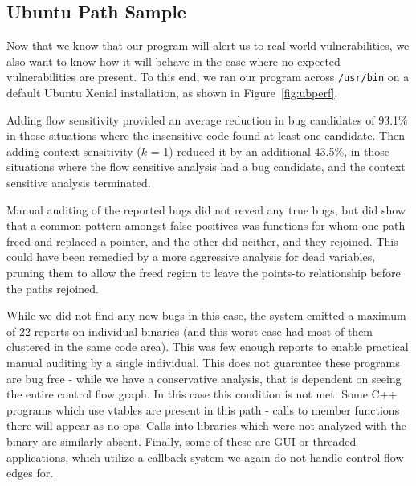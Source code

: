 \subsection{Ubuntu Path Sample}
Now that we know that our program will alert us to real world vulnerabilities, we also want to know how it will behave in the case where no expected vulnerabilities are present.
To this end, we ran our program across \texttt{/usr/bin} on a default Ubuntu Xenial installation, as shown in Figure~\ref{fig:ubperf}.

Adding flow sensitivity provided an average reduction in bug candidates of 93.1\% in those situations where the insensitive code found at least one candidate.
Then adding context sensitivity ($k$ = 1) reduced it by an additional 43.5\%, in those situations where the flow sensitive analysis had a bug candidate, and the context sensitive analysis terminated.

Manual auditing of the reported bugs did not reveal any true bugs, but did show that a common pattern amongst false positives was functions for whom one path freed and replaced a pointer, and the other did neither, and they rejoined.
This could have been remedied by a more aggressive analysis for dead variables, pruning them to allow the freed region to leave the points-to relationship before the paths rejoined.

While we did not find any new bugs in this case, the system emitted a maximum of 22 reports on individual binaries (and this worst case had most of them clustered in the same code area).
This was few enough reports to enable practical manual auditing by a single individual.
This does not guarantee these programs are bug free - while we have a conservative analysis, that is dependent on seeing the entire control flow graph.
In this case this condition is not met.
Some C++ programs which use vtables are present in this path - calls to member functions there will appear as no-ops.
Calls into libraries which were not analyzed with the binary are similarly absent.
Finally, some of these are GUI or threaded applications, which utilize a callback system we again do not handle control flow edges for.
